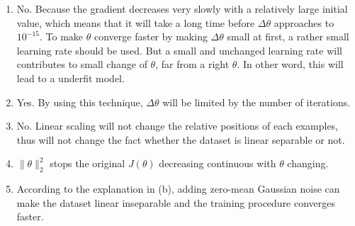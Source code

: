 \begin{answer}
	\begin{enumerate}
		\item
		No. Because the gradient decreases very slowly with a relatively large initial value, which means that it will take a long time before $\Delta\theta$ approaches to $10^{-15}$. To make $\theta$ converge faster by making $\Delta\theta$ small at first, a rather small learning rate should be used. But a small and unchanged learning rate will contributes to small change of $\theta$, far from a right $\theta$. In other word, this will lead to a underfit model.
		
		\item
		Yes. By using this technique, $\Delta\theta$ will be limited by the number of iterations.
		
		\item 
		No. Linear scaling will not change the relative positions of each examples, thus will not change the fact whether the dataset is linear separable or not.
		
		\item 
		$\|\theta\|_2^2$ stops the original $J(\theta)$ decreasing continuous with $\theta$ changing.
		
		\item
		According to the explanation in (b), adding zero-mean Gaussian noise can make the dataset linear inseparable and the training procedure converges faster.
	\end{enumerate}
\end{answer}
